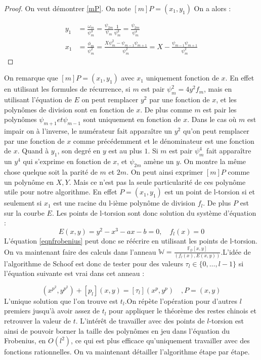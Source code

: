\documentclass{article}
\begin{document}
\begin{proof}
On veut démontrer \ref{mP}. 
\newline
On note $[m]P = (x_1, y_1)$ 
On a alors : 

\begin{align*}
y_1 &= \frac{\omega_m}{\psi^3_m} = \frac{\psi_{2m}}{\psi_m} \frac{1}{\psi_m^3} = \frac{\psi_{2m}}{\psi_m^4} \\
x_1 &= \frac{\phi_m}{\psi^2_m} =  \frac{X \psi^2_m - \psi_{m-1}\psi_{m+1}}{\psi_m^2} = X - \frac{\psi_{m-1}\psi_{m+1}}{\psi_m^2}	
\end{align*}




\end{proof}
On remarque que $[m]P = (x_1, y_1)$ avec $x_1$ uniquement fonction de $x$. En effet en utilisant les formules de récurrence, si $m$ est pair $\psi_m^2 = 4y^2f_m$, mais en utilisant l'équation de $E$ on peut remplacer $y^2$ par une fonction de $x$, et les polynômes de division sont en fonction de $x$. De plus comme $m$ est pair les polynômes $\psi_{m+1} et \psi_{m-1}$ sont uniquement en fonction de $x$. Dans le cas où $m$ est impair on à l'inverse, le numérateur fait apparaître un $y^2$ qu'on peut remplacer par une fonction de $x$ comme précédemment et le dénominateur est une fonction de $x$. Quand à $y_1$, son degré en $y$ est au plus $1$. Si $m$ est pair $\psi_m^4$ fait apparaître un $y^4$ qui s'exprime en fonction de $x$, et $\psi_{2m}$ amène un $y$. On montre la même chose quelque soit la parité de $m$ et $2m$.
On peut ainsi exprimer $[m]P$ comme un polynôme en $X,Y$. Mais ce n'est pas la seule particularité de ces polynôme utile pour notre algorithme. En effet $P = (x_1, y_1)$ est un point de l-torsion si et seulement si $x_1$ est une racine du l-ième polynôme de division $f_l$. De plus $P$ est sur la courbe $E$. Les points de l-torsion sont donc solution du système d'équation : 
\begin{equation}
E(x,y) = y^2 - x^3 - ax - b = 0, \quad f_l(x) = 0
\end{equation}
L'équation \ref{eqnfrobenius} peut donc se réécrire en utilisant les points de l-torsion. On va maintenant faire des calculs dans l'anneau $\mathbb{W}= \frac{\mathbb{F_p}[x,y]}{(f_l(x), E(x,y))}$.L'idée de l'algorithme de Schoof est donc de tester pour des valeurs $\tau_l \in \lbrace 0, \ldots, l-1 \rbrace$ si l'équation suivante est vrai dans cet anneau :

\begin{equation}
(x^{p^2}, y^{p^2}) + [p_l](x,y) = [\tau_l](x^{p}, y^{p})  \quad, P=(x,y)
\end{equation}
L'unique solution que l'on trouve est $t_l$.On répète l'opération pour d'autres $l$ premiers jusqu'à avoir assez de $t_l$ pour appliquer le théorème des restes chinois et retrouver la valeur de $t$. L’intérêt de travailler avec des points de $l$-torsion est ainsi de pouvoir borner la taille des polynômes en jeu dans l'équation du Frobenius, en $O(l^2)$, ce qui est plus efficace qu'uniquement travailler avec des fonctions rationnelles.
\newline
\medskip
On va maintenant détailler l'algorithme étape par étape. 
\end{document}
